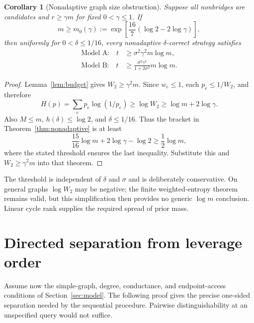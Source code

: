 \documentclass[11pt,letterpaper]{article}
\newtheorem{corollary}[theorem]{Corollary}
\begin{document}
\begin{corollary}[Nonadaptive graph size obstruction]\label{cor:nonadaptive-size}
Suppose all nonbridges are candidates and $r\ge\gamma m$ for fixed $0<\gamma\le1$. If
\[
 m\ge m_0(\gamma):=
 \exp\left[\frac{16}{7}\left(\log2-2\log\gamma\right)\right],
\]
then uniformly for $0<\delta\le1/16$, every nonadaptive $\delta$-correct strategy satisfies
\[
 \begin{aligned}
 \text{Model A:}\quad t&\ge\sigma^2\gamma^2m\log m,\\
 \text{Model B:}\quad t&\ge\frac{\sigma^2\gamma^2}{1+2\sigma^2}m\log m.
 \end{aligned}
\]
\end{corollary}
\begin{proof}
Lemma~\ref{lem:budget} gives $W_2\ge\gamma^2m$. Since $w_e\le1$, each $p_e\le1/W_2$, and therefore
\[
 H(p)=\sum_ep_e\log(1/p_e)\ge\log W_2
 \ge\log m+2\log\gamma.
\]
Also $M\le m$, $h(\delta)\le\log2$, and $\delta\le1/16$. Thus the bracket in Theorem~\ref{thm:nonadaptive} is at least
\[
 \frac{15}{16}\log m+2\log\gamma-\log2
 \ge\frac12\log m,
\]
where the stated threshold ensures the last inequality. Substitute this and $W_2\ge\gamma^2m$ into that theorem.
\end{proof}

The threshold is independent of $\delta$ and $\sigma$ and is deliberately conservative. On general graphs $\log W_2$ may be negative; the finite weighted-entropy theorem remains valid, but this simplification then provides no generic $\log m$ conclusion. Linear cycle rank supplies the required spread of prior mass.

\section{Directed separation from leverage order}
Assume now the simple-graph, degree, conductance, and endpoint-access conditions of Section~\ref{sec:model}. The following proof gives the precise one-sided separation needed by the sequential procedure. Pairwise distinguishability at an unspecified query would not suffice.
\end{document}
